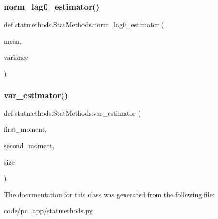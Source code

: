 \subsubsection{\texorpdfstring{norm\+\_\+lag0\+\_\+estimator()}{norm\_lag0\_estimator()}}
{\footnotesize\ttfamily def statmethods.\+Stat\+Methods.\+norm\+\_\+lag0\+\_\+estimator (\begin{DoxyParamCaption}\item[{}]{mean,  }\item[{}]{variance }\end{DoxyParamCaption})}

\mbox{\label{classstatmethods_1_1StatMethods_ae9dd94cc0586ae5ea83ac6cf4a81cb69}} 
\subsubsection{\texorpdfstring{var\+\_\+estimator()}{var\_estimator()}}
{\footnotesize\ttfamily def statmethods.\+Stat\+Methods.\+var\+\_\+estimator (\begin{DoxyParamCaption}\item[{}]{first\+\_\+moment,  }\item[{}]{second\+\_\+moment,  }\item[{}]{size }\end{DoxyParamCaption})}



The documentation for this class was generated from the following file\+:\begin{DoxyCompactItemize}
\item 
code/pc\+\_\+app/\hyperlink{statmethods_8py}{statmethods.\+py}\end{DoxyCompactItemize}

